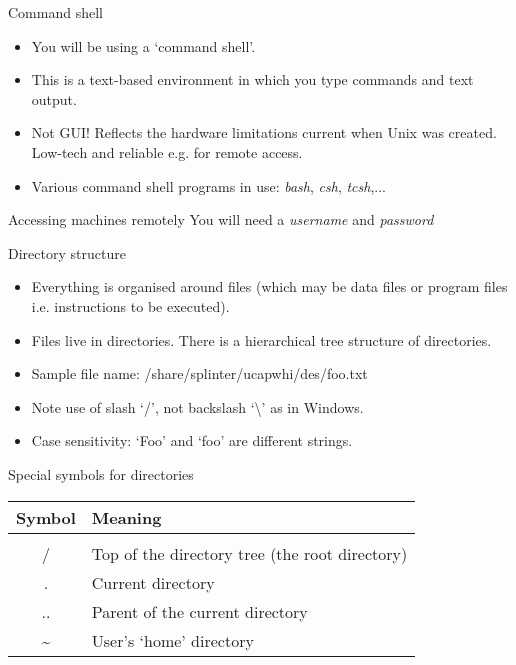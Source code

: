 \documentclass{beamer}
\begin{document}
\begin{frame}{Command shell}
  \begin{itemize}
    \item{You will be using a `command shell'.}
    \item{This is a text-based environment in which you type commands and text output.}
    \item{Not GUI! Reflects the hardware limitations current when Unix was created. Low-tech and reliable e.g. for remote access.}
    \item{Various command shell programs in use: \textit{bash}, \textit{csh}, \textit{tcsh},...}
   \end{itemize}
\end{frame}

\begin{frame}[fragile]{Accessing machines remotely}
  \alert{You will need a \emph{username} and \emph{password}}
  \begin{block}{}
    
  \end{block}
\end{frame}

\begin{frame}{Directory structure}
  \begin{itemize}
    \item{Everything is organised around files (which may be data files or program files i.e. instructions to be executed).}
    \item{Files live in directories. There is a hierarchical tree structure of directories.}
    \item{Sample file name: /share/splinter/ucapwhi/des/foo.txt}
    \item{Note use of slash `/', not backslash `\textbackslash' as in Windows.}
    \item{Case sensitivity: `Foo' and `foo' are different strings.}
  \end{itemize}
\end{frame}

\begin{frame}{Special symbols for directories}
  \begin{table}[ht]
    \centering
    \begin{tabular}{c l}
      \\ [-2ex]
      Symbol & Meaning \\ [.5ex]
      \hline \\ [-2ex]
      / & Top of the directory tree (the root directory) \\
      . & Current directory \\
      .. & Parent of the current directory \\
      \textasciitilde & User's `home' directory
    \end{tabular}
  \end{table}
\end{frame}
\end{document}
